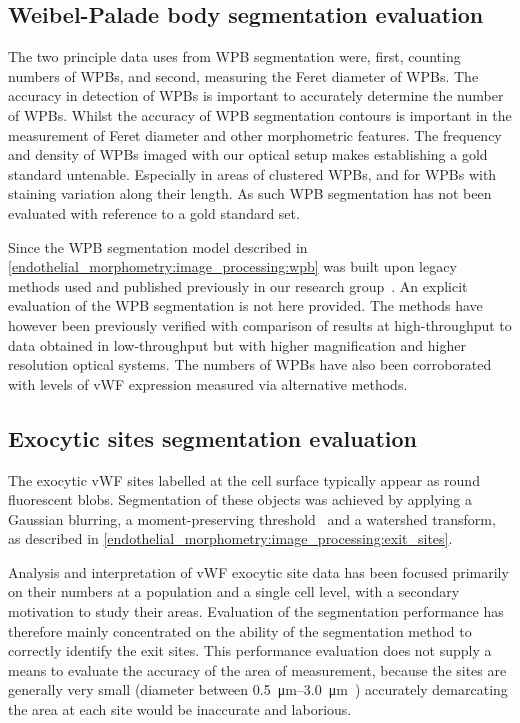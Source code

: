 \subsection{Weibel-Palade body segmentation evaluation}
\label{endothelial_morphometry:performance_evaluation:WPB}
The two principle data uses from WPB segmentation were, first, counting numbers of WPBs, and second, measuring the Feret diameter of WPBs. The accuracy in detection of WPBs is important to accurately determine the number of WPBs. Whilst the accuracy of WPB segmentation contours is important in the measurement of Feret diameter and other morphometric features. The frequency and density of WPBs imaged with our optical setup makes establishing a gold standard untenable. Especially in areas of clustered WPBs, and for WPBs with staining variation along their length. As such WPB segmentation has not been evaluated with reference to a gold standard set.

Since the WPB segmentation model described in \autoref{endothelial_morphometry:image_processing:wpb} was built upon legacy methods used and published previously in our research group~\cite{Ferraro2014,Stevenson2014}. An explicit evaluation of the WPB segmentation is not here provided. The methods have however been previously verified with comparison of results at high-throughput to data obtained in low-throughput but with higher magnification and higher resolution optical systems. The numbers of WPBs have also been corroborated with levels of vWF expression measured via alternative methods.

\subsection{Exocytic sites segmentation evaluation}
\label{endothelial_morphometry:performance_evaluation:exit_sites}
The exocytic vWF sites labelled at the cell surface typically appear as round fluorescent blobs. Segmentation of these objects was achieved by applying a Gaussian blurring, a moment-preserving threshold~\cite{Tsai1985} and a watershed transform, as described in \autoref{endothelial_morphometry:image_processing:exit_sites}.

Analysis and interpretation of vWF exocytic site data has been focused primarily on their numbers at a population and a single cell level, with a secondary motivation to study their areas. Evaluation of the segmentation performance has therefore mainly concentrated on the ability of the segmentation method to correctly identify the exit sites. This performance evaluation does not supply a means to evaluate the accuracy of the area of measurement, because the sites are generally very small (diameter between \SIrange{0.5}{3.0}{\micro\meter}~\cite{Valentijn2010}) accurately demarcating the area at each site would be inaccurate and laborious.

